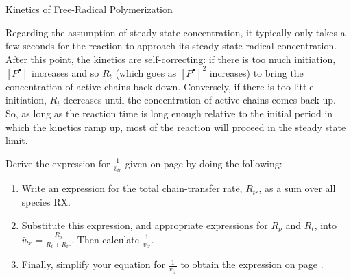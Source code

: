 \begin{activity}{Kinetics of Free-Radical Polymerization}
\begin{exercises}
\begin{solution}
{					Regarding the assumption of steady-state concentration, it typically only takes a few seconds for the reaction to approach its steady state radical concentration.  After this point, the kinetics are self-correcting: if there is too much initiation, $[P^\bullet]$ increases and so $R_t$ (which goes as $[P^\bullet]^2$ increases) to bring the concentration of active chains back down.  Conversely, if there is too little initiation, $R_t$ decreases until the concentration of active chains comes back up.  So, as long as the reaction time is long enough relative to the initial period in which the kinetics ramp up, most of the reaction will proceed in the steady state limit.  
				}\end{solution}
		
	\exercise Derive the expression for $\frac{1}{\bar v_{tr}}$ given on page \pageref{\labelbase:info:vtr} by doing the following:
	
		\label{\labelbase:exc:chainxfer}
		
		\begin{enumerate}
			\item Write an expression for the total chain-transfer rate, $R_{tr}$, as a sum over all species RX.
			
				\begin{solution}\end{solution}
				
			\item Substitute this expression, and appropriate expressions for $R_p$ and $R_t$, into $\bar v_{tr} = \frac{R_p}{R_t + R_{tr}}$.  Then calculate $\frac{1}{v_{tr}}$.
			
				\begin{solution}\end{solution}
				
			\item Finally, simplify your equation for $\frac{1}{v_{tr}}$ to obtain the expression on page \pageref{\labelbase:info:vtr}.
			

\end{enumerate}
\end{exercises}
\end{activity}
